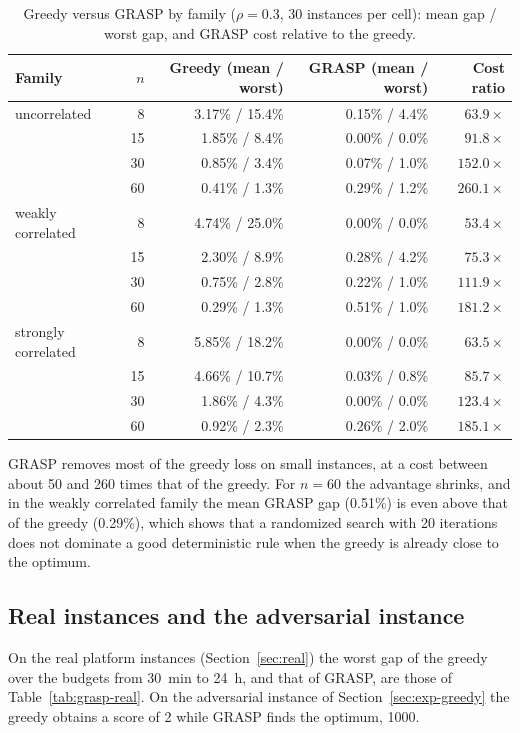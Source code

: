 \begin{table}[h]
\centering
\caption{Greedy versus GRASP by family ($\rho=0.3$, 30 instances per cell): mean gap / worst gap, and GRASP cost relative to the greedy.}\label{tab:grasp-families}
\small
\begin{tabular}{@{}l r r r r@{}}
\toprule
Family & $n$ & Greedy (mean / worst) & GRASP (mean / worst) & Cost ratio\\
\midrule
uncorrelated & 8 & 3.17\% / 15.4\% & 0.15\% / 4.4\% & $63.9\times$\\
 & 15 & 1.85\% / 8.4\% & 0.00\% / 0.0\% & $91.8\times$\\
 & 30 & 0.85\% / 3.4\% & 0.07\% / 1.0\% & $152.0\times$\\
 & 60 & 0.41\% / 1.3\% & 0.29\% / 1.2\% & $260.1\times$\\
weakly correlated & 8 & 4.74\% / 25.0\% & 0.00\% / 0.0\% & $53.4\times$\\
 & 15 & 2.30\% / 8.9\% & 0.28\% / 4.2\% & $75.3\times$\\
 & 30 & 0.75\% / 2.8\% & 0.22\% / 1.0\% & $111.9\times$\\
 & 60 & 0.29\% / 1.3\% & 0.51\% / 1.0\% & $181.2\times$\\
strongly correlated & 8 & 5.85\% / 18.2\% & 0.00\% / 0.0\% & $63.5\times$\\
 & 15 & 4.66\% / 10.7\% & 0.03\% / 0.8\% & $85.7\times$\\
 & 30 & 1.86\% / 4.3\% & 0.00\% / 0.0\% & $123.4\times$\\
 & 60 & 0.92\% / 2.3\% & 0.26\% / 2.0\% & $185.1\times$\\
\bottomrule
\end{tabular}
\end{table}

GRASP removes most of the greedy loss on small instances, at a cost between about 50 and 260 times that of the greedy. For $n=60$ the advantage shrinks, and in the weakly correlated family the mean GRASP gap (0.51\%) is even above that of the greedy (0.29\%), which shows that a randomized search with 20 iterations does not dominate a good deterministic rule when the greedy is already close to the optimum.

\subsection{Real instances and the adversarial instance}

On the real platform instances (Section~\ref{sec:real}) the worst gap of the greedy over the budgets from 30~min to 24~h, and that of GRASP, are those of Table~\ref{tab:grasp-real}. On the adversarial instance of Section~\ref{sec:exp-greedy} the greedy obtains a score of 2 while GRASP finds the optimum, 1000.


